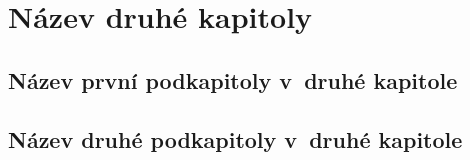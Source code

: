 \chapter{Název druhé kapitoly}

\section{Název první podkapitoly v~druhé kapitole}

\section{Název druhé podkapitoly v~druhé kapitole}

